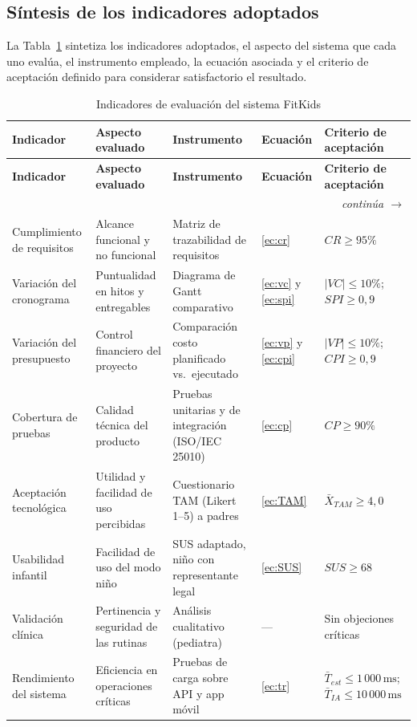 			\subsection{Síntesis de los indicadores adoptados}
				La Tabla~\ref{tab:indicadores} sintetiza los indicadores adoptados, el aspecto del sistema que cada uno evalúa, el instrumento empleado, la ecuación asociada y el criterio de aceptación definido para considerar satisfactorio el resultado.
				
				\begingroup
				\setlength{\LTpre}{6pt}\setlength{\LTpost}{2pt}
				\renewcommand{\arraystretch}{1.15}
				\small
				\begin{longtable}{p{2.3cm}p{2.95cm}p{3cm}p{1.5cm}p{3.75cm}}
					\caption{Indicadores de evaluación del sistema FitKids}\label{tab:indicadores}\\
					\hline
					\textbf{Indicador} & \textbf{Aspecto evaluado} & \textbf{Instrumento} & \textbf{Ecuación} & \textbf{Criterio de aceptación}\\
					\hline
					\endfirsthead
					\hline
					\textbf{Indicador} & \textbf{Aspecto evaluado} & \textbf{Instrumento} & \textbf{Ecuación} & \textbf{Criterio de aceptación}\\
					\hline
					\endhead
					\hline
					\multicolumn{5}{r}{\footnotesize\itshape continúa $\rightarrow$}\\
					\endfoot
					\hline
					\endlastfoot
					Cumplimiento de requisitos & Alcance funcional y no funcional & Matriz de trazabilidad de requisitos & \eqref{ec:cr} & $CR \geq 95\%$\\
					Variación del cronograma & Puntualidad en hitos y entregables & Diagrama de Gantt comparativo & \eqref{ec:vc} y \eqref{ec:spi} & $|VC| \leq 10\%$; $SPI \geq 0{,}9$\\
					Variación del presupuesto & Control financiero del proyecto & Comparación costo planificado vs.\ ejecutado & \eqref{ec:vp} y \eqref{ec:cpi} & $|VP| \leq 10\%$; $CPI \geq 0{,}9$\\
					Cobertura de pruebas & Calidad técnica del producto & Pruebas unitarias y de integración (ISO/IEC 25010) & \eqref{ec:cp} & $CP \geq 90\%$\\
					Aceptación tecnológica & Utilidad y facilidad de uso percibidas & Cuestionario TAM (Likert 1--5) a padres & \eqref{ec:TAM} & $\bar{X}_{TAM} \geq 4{,}0$\\
					Usabilidad infantil & Facilidad de uso del modo niño & SUS adaptado, niño con representante legal & \eqref{ec:SUS} & $SUS \geq 68$\\
					Validación clínica & Pertinencia y seguridad de las rutinas & Análisis cualitativo (pediatra) & --- & Sin objeciones críticas\\
					Rendimiento del sistema & Eficiencia en operaciones críticas & Pruebas de carga sobre API y app móvil & \eqref{ec:tr} & $\bar{T}_{est} \leq 1\,000\,\text{ms}$; $\bar{T}_{IA} \leq 10\,000\,\text{ms}$\\
				\end{longtable}
				\vspace{12pt}
				\tblnote
				\endgroup
				
